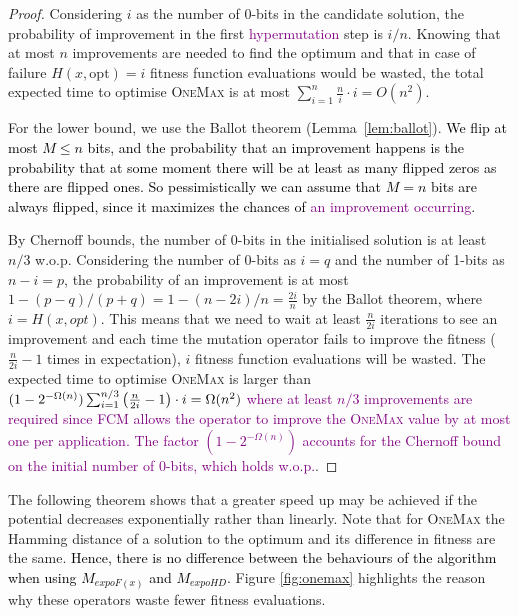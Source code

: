 \documentclass[lettersize,journal]{IEEEtran}
\newcommand{\new}[1]{\textcolor{black}{#1}}
\newcommand{\rerev}[1]{\textcolor{purple}{#1}}
\begin{document}
\begin{proof}
Considering $i$ as the number of 0-bits in the candidate solution, the probability of improvement in the first \rerev{hypermutation} step is $i/n$. Knowing that at most $n$ improvements are needed to find the optimum and that in case of failure $H(x,\text{opt})=i$ fitness function evaluations would be wasted, the total expected time to optimise \textsc{OneMax} is at most $\sum_{i=1}^n \frac{n}{i} \cdot i =O(n^2)$.

For the lower bound, we use the Ballot theorem (Lemma~\ref{lem:ballot}). 
\new{We flip at most $M \le n$ bits, and the probability that an improvement happens is the probability that at some moment there will be at least as many flipped zeros as there are flipped ones. So pessimistically we can assume that  $M = n$ bits are always flipped, since it maximizes the chances of \rerev{an improvement occurring}.} 

By Chernoff bounds, the number of 0-bits in the initialised solution is at least $n/3$ w.o.p. Considering the number of 
0-bits as $i=q$ and the number of 1-bits as $n-i=p$, the probability of 
an improvement is at most $1-(p-q)/(p+q)=1-(n-2i)/n=\frac{2i}{n}$ by the Ballot theorem, where $i=H(x, opt)$. This means that we need to wait at least $\frac{n}{2i}$ iterations to see an improvement and each time the mutation operator fails to improve the fitness {(\color{black}$\frac{n}{2i} - 1$ times in expectation)}, $i$ fitness function evaluations will be wasted. The expected time to optimise \textsc{OneMax} is larger than \textcolor{black}{$(1-2^{-\Omega(n)})\sum_{i=1}^{n/3} {\color{black}\left(\frac{n}{2i}-1\right)} \cdot i = \Omega(n^2)$} \rerev{where at least $n/3$ improvements are required since FCM allows the operator to improve the \textsc{OneMax} value by at most one per application. The factor $(1-2^{-\Omega(n)})$ accounts for the Chernoff bound on the initial number of $0$-bits, which holds w.o.p.}.
\end{proof}

The following theorem shows that a greater speed up may be achieved if the potential decreases exponentially rather than linearly. Note that for \textsc{OneMax} the Hamming distance of a solution to the optimum and its difference in fitness are the same. \new{Hence, there is no difference between the behaviours of the algorithm when using $M_{expoF(x)}$ and $M_{expoHD}$.} 
Figure \ref{fig:onemax} highlights the reason why these operators waste fewer fitness evaluations.
\end{document}
